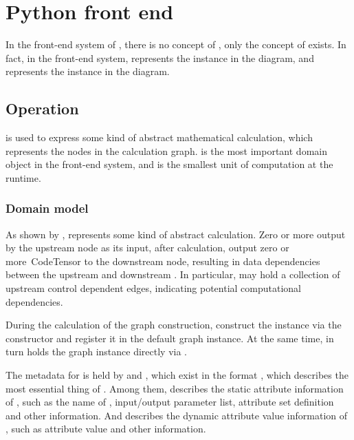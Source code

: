 \section{Python front end}
\begin{content}
In the front-end system of , there is no concept of , only the concept of  exists. In fact, in the front-end  system,  represents the  instance in the diagram, and  represents the  instance in the diagram.


\subsection{Operation}
 is used to express some kind of abstract mathematical calculation, which represents the nodes in the calculation graph.  is the most important domain object in the front-end  system, and is the smallest unit of computation at the \tf{} runtime.


\subsubsection{Domain model}
As shown by ,  represents some kind of abstract calculation. Zero or more  output by the upstream node as its input, after calculation, output zero or more\ Code{Tensor} to the downstream node, resulting in data dependencies between the upstream and downstream . In particular,  may hold a collection of upstream control dependent edges, indicating potential computational dependencies.

During the calculation of the graph construction, construct the  instance via the  constructor and register it in the default graph instance. At the same time,  in turn holds the graph instance directly via .

The metadata for  is held by  and , which exist in the format , which describes the most essential thing of . Among them,  describes the static attribute information of , such as the name of , input/output parameter list, attribute set definition and other information. And  describes the dynamic attribute value information of , such as attribute value and other information.


\end{content}
